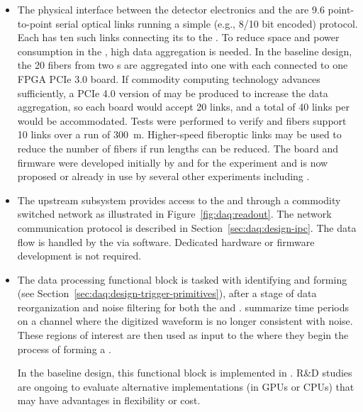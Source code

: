 \begin{itemize}
  
  \item The physical interface between the detector electronics and the  are \SI{9.6}{\Gbps}
point-to-point serial optical links running a simple (e.g., 8/10 bit encoded) protocol.  Each
 has ten such links connecting its  to the . To reduce space and
power consumption in the , high data aggregation is needed. In the baseline design, the
\num{20} fibers from two s are aggregated into one  with each  connected
to one  FPGA PCIe 3.0 board.  If commodity computing technology advances sufficiently, a PCIe 4.0 version of
 may be produced to increase the data aggregation, so each board would accept \num{20}
links, and a total of \num{40} links per  would be accommodated. Tests were performed to verify
 and  fibers support \SI{10}{\Gbps} links over a run of \SI{300}{\meter}.
Higher-speed fiberoptic links may be used to reduce the number of fibers if run
lengths can be reduced. The  board and firmware were developed initially by and for the
 experiment and is now proposed or already in use by several other experiments including
.
  
  \item The upstream  subsystem provides access to the
 and  through a commodity switched network as
illustrated in Figure~\ref{fig:daq:readout}. The network communication
protocol is described in Section~\ref{sec:daq:design-ipc}. The data flow
is handled by the  via software. Dedicated hardware or firmware
development is not required.

\item The data processing functional block is tasked with identifying and forming  (see
Section~\ref{sec:daq:design-trigger-primitives}), after a stage of data
reorganization and noise filtering for both the  and .  summarize time periods on a channel where the digitized waveform is no longer consistent with noise.
These regions of interest are then used as input to the  where they begin the process of forming a .

In the baseline design, this functional block is implemented in .
R\&D studies are ongoing to evaluate alternative implementations (in GPUs or CPUs) that may have advantages in flexibility or cost.


\end{itemize}
